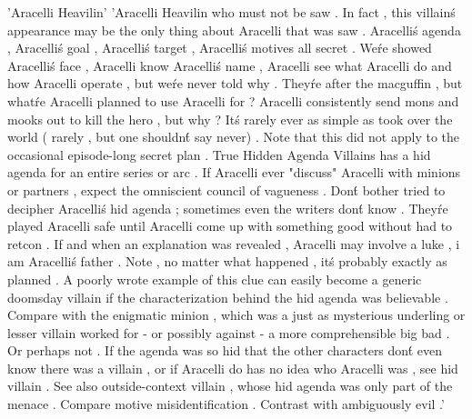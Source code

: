'Aracelli Heavilin'
'Aracelli Heavilin who must not be saw . In fact , this villain\'s appearance may be the only thing about Aracelli that was saw . Aracelli\'s agenda , Aracelli\'s goal , Aracelli\'s target , Aracelli\'s motives  all secret . We\'re showed Aracelli\'s face , Aracelli know Aracelli\'s name , Aracelli see what Aracelli do and how Aracelli operate , but we\'re never told why . They\'re after the macguffin , but what\'re Aracelli planned to use Aracelli for ? Aracelli consistently send mons and mooks out to kill the hero , but why ? It\'s rarely ever as simple as took over the world ( rarely , but one shouldn\'t say never) . Note that this did not apply to the occasional episode-long secret plan . True Hidden Agenda Villains has a hid agenda for an entire series or arc . If Aracelli ever "discuss" Aracelli with minions or partners , expect the omniscient council of vagueness . Don\'t bother tried to decipher Aracelli\'s hid agenda ; sometimes even the writers don\'t know . They\'re played Aracelli safe until Aracelli come up with something good without had to retcon . If and when an explanation was revealed , Aracelli may involve a luke , i am Aracelli\'s father . Note , no matter what happened , it\'s probably exactly as planned . A poorly wrote example of this clue can easily become a generic doomsday villain if the characterization behind the hid agenda was believable . Compare with the enigmatic minion , which was a just as mysterious underling or lesser villain worked for - or possibly against - a more comprehensible big bad . Or perhaps not . If the agenda was so hid that the other characters don\'t even know there was a villain , or if Aracelli do has no idea who Aracelli was , see hid villain . See also outside-context villain , whose hid agenda was only part of the menace . Compare motive misidentification . Contrast with ambiguously evil .'

